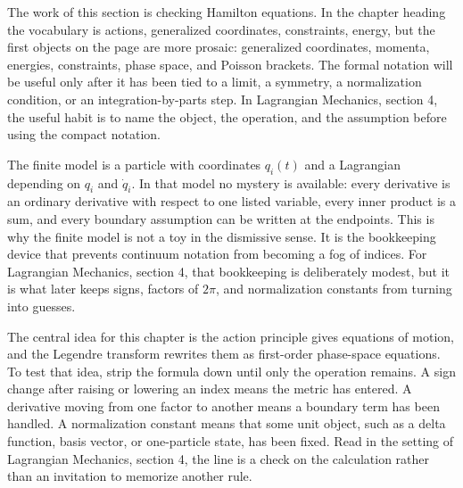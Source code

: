 











The work of this section is checking Hamilton equations.  In the chapter heading the vocabulary is actions, generalized coordinates, constraints, energy, but the first objects on the page are more prosaic: generalized coordinates, momenta, energies, constraints, phase space, and Poisson brackets.  The formal notation will be useful only after it has been tied to a limit, a symmetry, a normalization condition, or an integration-by-parts step.  In Lagrangian Mechanics, section 4, the useful habit is to name the object, the operation, and the assumption before using the compact notation.

The finite model is a particle with coordinates \(q_i(t)\) and a Lagrangian depending on \(q_i\) and \(\dot q_i\).  In that model no mystery is available: every derivative is an ordinary derivative with respect to one listed variable, every inner product is a sum, and every boundary assumption can be written at the endpoints.  This is why the finite model is not a toy in the dismissive sense.  It is the bookkeeping device that prevents continuum notation from becoming a fog of indices.  For Lagrangian Mechanics, section 4, that bookkeeping is deliberately modest, but it is what later keeps signs, factors of \(2\pi\), and normalization constants from turning into guesses.

The central idea for this chapter is the action principle gives equations of motion, and the Legendre transform rewrites them as first-order phase-space equations.  To test that idea, strip the formula down until only the operation remains.  A sign change after raising or lowering an index means the metric has entered.  A derivative moving from one factor to another means a boundary term has been handled.  A normalization constant means that some unit object, such as a delta function, basis vector, or one-particle state, has been fixed.  Read in the setting of Lagrangian Mechanics, section 4, the line is a check on the calculation rather than an invitation to memorize another rule.

